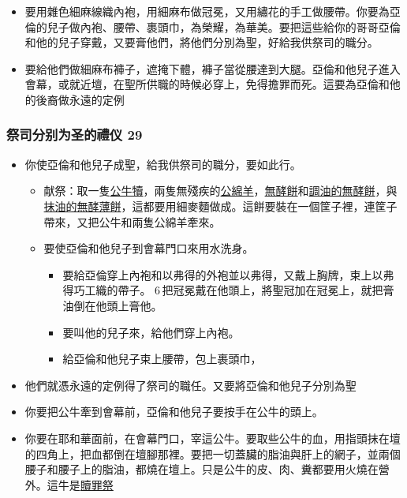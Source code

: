 \begin{table}
\begin{itemize} 
\itemsep-.35em
\item 要用雜色細麻線織內袍，用細麻布做冠冕，又用繡花的手工做腰帶。你要為亞倫的兒子做內袍、腰帶、裹頭巾，為榮耀，為華美。要把這些給你的哥哥亞倫和他的兒子穿戴，又要膏他們，將他們分別為聖，好給我供祭司的職分。 
\item 要給他們做細麻布褲子，遮掩下體，褲子當從腰達到大腿。亞倫和他兒子進入會幕，或就近壇，在聖所供職的時候必穿上，免得擔罪而死。這要為亞倫和他的後裔做永遠的定例
\end{itemize}

\subsubsection{祭司分别为圣的禮仪 29}
\begin{itemize} 
\itemsep-.35em
\item 你使亞倫和他兒子成聖，給我供祭司的職分，要如此行。
\begin{itemize} 
\itemsep-.35em
\item 献祭：取一隻\underline{公牛犢}，兩隻無殘疾的\underline{公綿羊}，\underline{無酵餅}和\underline{調油的無酵餅}，與\underline{抹油的無酵薄餅}，這都要用細麥麵做成。這餅要裝在一個筐子裡，連筐子帶來，又把公牛和兩隻公綿羊牽來。
\item 要使亞倫和他兒子到會幕門口來用水洗身。 
\begin{itemize} 
\itemsep-.35em
\item 要給亞倫穿上內袍和以弗得的外袍並以弗得，又戴上胸牌，束上以弗得巧工織的帶子。 6 把冠冕戴在他頭上，將聖冠加在冠冕上，就把膏油倒在他頭上膏他。 
\item 要叫他的兒子來，給他們穿上內袍。 
\item 給亞倫和他兒子束上腰帶，包上裹頭巾，
\end{itemize} 
\end{itemize}
\item 他們就憑永遠的定例得了祭司的職任。又要將亞倫和他兒子分別為聖
\end{itemize}


\begin{itemize} 
\itemsep-.35em
\item 你要把公牛牽到會幕前，亞倫和他兒子要按手在公牛的頭上。 
\item 你要在耶和華面前，在會幕門口，宰這公牛。要取些公牛的血，用指頭抹在壇的四角上，把血都倒在壇腳那裡。要把一切蓋臟的脂油與肝上的網子，並兩個腰子和腰子上的脂油，都燒在壇上。只是公牛的皮、肉、糞都要用火燒在營外。這牛是\underline{贖罪祭}
\end{itemize}


\end{table}
